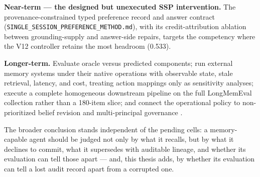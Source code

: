 \textbf{Near-term --- the designed but unexecuted SSP intervention.} The
provenance-constrained typed preference record and answer contract
(\texttt{SINGLE\_SESSION\_PREFERENCE\_METHOD.md}), with its
credit-attribution ablation between grounding-supply and answer-side
repairs, targets the competency where the V12 controller retains the
most headroom (0.533).

\textbf{Longer-term.} Evaluate oracle versus predicted components; run
external memory systems under their native operations with observable
state, stale retrieval, latency, and cost, treating action mappings only
as sensitivity analyses; execute a complete homogeneous downstream
pipeline on the full LongMemEval collection rather than a 180-item
slice; and connect the operational policy to non-prioritized belief
revision \citep{alchourron1985theory} and multi-principal governance
\citep{ren2026gatemem}.

The broader conclusion stands independent of the pending cells: a
memory-capable agent should be judged not only by what it recalls, but
by what it declines to commit, what it supersedes with auditable
lineage, and whether its evaluation can tell those apart --- and, this
thesis adds, by whether its evaluation can tell a lost audit record
apart from a corrupted one.
